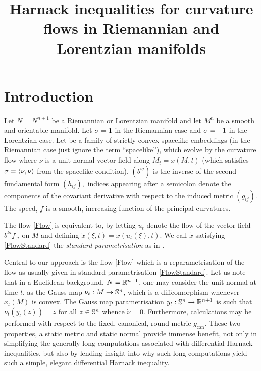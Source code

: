 




\title[Harnack inequalities for curvature flows]{Harnack inequalities for curvature flows in Riemannian and Lorentzian manifolds}

\maketitle
\section{Introduction}
\label{sec:intro}

Let $N=N^{n+1}$ be a Riemannian or Lorentzian manifold and let $M^{n}$ be a smooth and orientable manifold. Let $\s = 1$ in the Riemannian case and $\s = -1$ in the Lorentzian case. Let
\eq{x\cn M^{n}\x[0,T)\ra N}
be a family of strictly convex spacelike embeddings (in the Riemannian case just ignore the term ``spacelike''), which evolve by the curvature flow
where $\nu$ is a unit normal vector field along $M_{t}=x(M,t)$ (which satisfies $\s=\ip{\nu}{\nu}$ from the spacelike condition), $(b^{ij})$ is the inverse of the second fundamental form $(h_{ij}),$ indices appearing after a semicolon denote the components of the covariant derivative with respect to the induced metric $(g_{ij})$. The speed, $f$ is a smooth, increasing function of the principal curvatures.

The flow \eqref{Flow} is equivalent to,
by letting \(u_t\) denote the flow of the vector field $b^{ki}f_{;i}$ on $M$ and defining $\tilde{x} (\xi, t) = x (u_t(\xi), t)$. We call $\tilde{x}$ satisfying \eqref{FlowStandard} the \emph{standard parametrisation} as in \cite{Andrews:09/1994}.

Central to our approach is the flow \eqref{Flow} which is a reparametrisation of the flow as usually given in standard parametrisation \eqref{FlowStandard}. Let us note that in a Euclidean background, $N = \R^{n+1}$, one may consider the unit normal at time $t$, as the Gauss map $\nu_t : M \to \S^n$, which is a diffeomorphism whenever $x_t(M)$ is convex. The Gauss map parametrisation $y_t: \S^n \to \R^{n+1}$ \cite{Andrews:09/1994} is such that $\nu_t(y_t(z)) = z$ for all $z \in \S^n$ whence $\dot{\nu} = 0$. Furthermore, calculations may be performed with respect to the fixed, canonical, round metric $g_{\operatorname{can}}$. These two properties, a static metric and static normal provide immense benefit, not only in simplifying the generally long computations associated with differential Harnack inequalities, but also by lending insight into why such long computations yield such a simple, elegant differential Harnack inequality.

